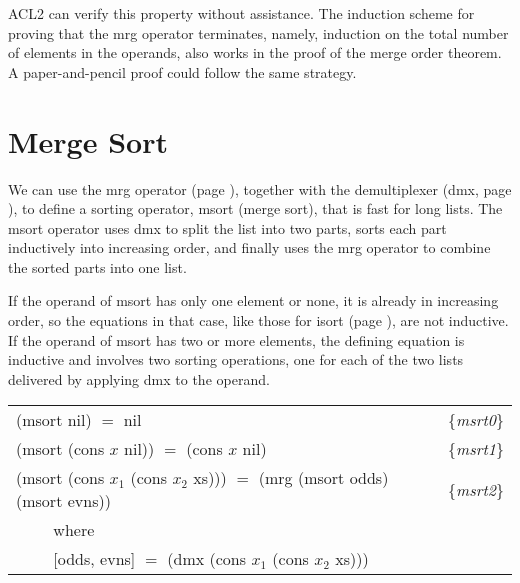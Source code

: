 ACL2 can verify this property without assistance.
The induction scheme for proving that
the \textsf{mrg} operator terminates,
namely, induction on the total number of elements in the operands,
also works in the proof of the merge order theorem.
A paper-and-pencil proof could follow the same strategy.

\begin{exercises}




\end{exercises}

\section{Merge Sort}
\label{sec:msort}

We can use the \textsf{mrg} operator (page \pageref{defun:mrg}),
together with the demultiplexer (\textsf{dmx}, page \pageref{dmx-defun}),
to define a sorting operator, \textsf{msort} (merge sort), that is fast for long lists.
The \textsf{msort} operator uses \textsf{dmx} to split the list into two parts,
sorts each part inductively into increasing order, and finally
uses the \textsf{mrg} operator to combine the sorted parts into one list.

If the operand of \textsf{msort} has only one element or none,
it is already in increasing order,
so the equations in that case,
like those for \textsf{isort} (page \pageref{eq:isrt0}),
are not inductive.
If the operand of \textsf{msort} has two or more elements,
the defining equation is inductive and
involves two sorting operations,
one for each of the two lists delivered by applying
\textsf{dmx} to the operand.

\begin{center}
\label{eq:msrt1}
\label{eq:msrt0}
\label{eq:msrt2}
\begin{tabular}{ll}
\textsf{(msort nil) $=$ nil}                        & \{\emph{msrt0}\} \\
\textsf{(msort (cons $x$ nil)) $=$ (cons $x$ nil)} & \{\emph{msrt1}\} \\
\textsf{(msort (cons $x_1$ (cons $x_2$ xs))) $=$ (mrg (msort odds) (msort evns))} & \{\emph{msrt2}\} \\
 ~~~~ where  & \\
 ~~~~ \textsf{[odds, evns] $=$ (dmx (cons $x_1$ (cons $x_2$ xs)))} & \\
\end{tabular}
\end{center}

